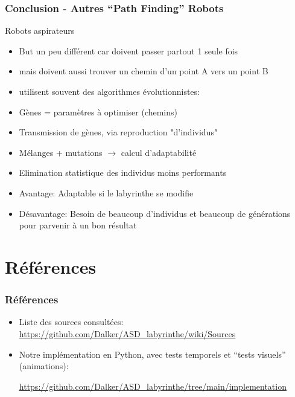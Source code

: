 \documentclass[]{beamer}
\begin{document}
\begin{frame}
  \frametitle{Conclusion - Autres ``Path Finding'' Robots}
  Robots aspirateurs
  \begin{itemize} \item But un peu différent car doivent passer partout 1 seule fois
  \item mais doivent aussi trouver un chemin d'un point A vers un point B
  \item utilisent souvent des algorithmes évolutionnistes:
  \item Gènes = paramètres à optimiser (chemins) 
  \item Transmission de gènes, via reproduction "d'individus"
  \item Mélanges + mutations $\rightarrow$ calcul d'adaptabilité
  \item Elimination statistique des individus moins performants
  \item Avantage: Adaptable si le labyrinthe se modifie
  \item Désavantage: Besoin de beaucoup d'individus et beaucoup de générations 
   pour parvenir à un bon résultat  
  \end{itemize}
\end{frame}

\section{Références}
\begin{frame}
  \frametitle{Références}
  \begin{itemize}
  \item Liste des sources consultées:
    \url{https://github.com/Dalker/ASD_labyrinthe/wiki/Sources}
  \item Notre implémentation en Python, avec tests temporels et ``tests
    visuels'' (animations):
    
    \url{https://github.com/Dalker/ASD_labyrinthe/tree/main/implementation}
  \end{itemize}
\end{frame}
\end{document}
